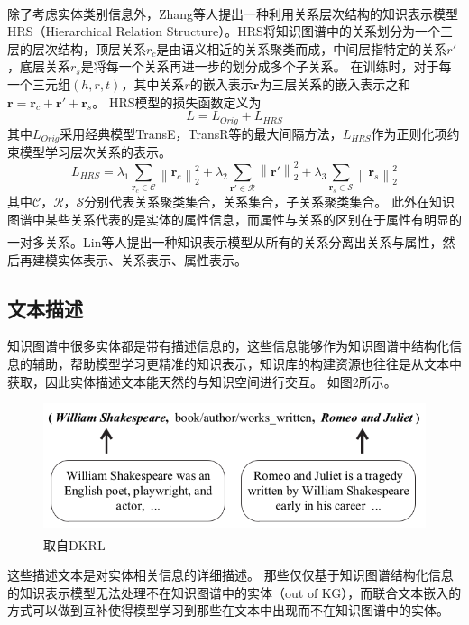 \documentclass[twocolumn]{article}
\newcommand{\upcite}[1]{\textsuperscript{\textsuperscript{\cite{#1}}}}
\begin{document}
	除了考虑实体类别信息外，Zhang等人\upcite{HRS}提出一种利用关系层次结构的知识表示模型HRS（Hierarchical Relation Structure）。HRS将知识图谱中的关系划分为一个三层的层次结构，顶层关系$r_c$是由语义相近的关系聚类而成，中间层指特定的关系$r'$，底层关系$r_s$是将每一个关系再进一步的划分成多个子关系。
	在训练时，对于每一个三元组$(h,r,t)$，其中关系$r$的嵌入表示$\textbf{r}$为三层关系的嵌入表示之和
	$\textbf{r}=\textbf{r}_c+\textbf{r}'+\textbf{r}_s$。
	HRS模型的损失函数定义为
	\begin{equation}
		L=L_{Orig}+L_{HRS}
	\end{equation}
	其中$L_{Orig}$采用经典模型TransE，TransR等的最大间隔方法，$L_{HRS}$作为正则化项约束模型学习层次关系的表示。
	\begin{equation}
		L_{HRS}=\lambda_1\sum_{\textbf{r}_c\in \mathcal{C}}\left \| \textbf{r}_c \right \|_2^2+\lambda_2\sum_{\textbf{r}'\in \mathcal{R}}\left \| \textbf{r}' \right \|_2^2+\lambda_3\sum_{\textbf{r}_s\in\mathcal{S}}\left \| \textbf{r}_s \right \|_2^2
	\end{equation}
	其中$\mathcal{C}$，$\mathcal{R}$，$\mathcal{S}$分别代表关系聚类集合，关系集合，子关系聚类集合。
	此外在知识图谱中某些关系代表的是实体的属性信息，而属性与关系的区别在于属性有明显的一对多关系。Lin等人\upcite{EAR}提出一种知识表示模型从所有的关系分离出关系与属性，然后再建模实体表示、关系表示、属性表示。
	
	
\subsection{文本描述}
	知识图谱中很多实体都是带有描述信息的，这些信息能够作为知识图谱中结构化信息的辅助，帮助模型学习更精准的知识表示，知识库的构建资源也往往是从文本中获取，因此实体描述文本能天然的与知识空间进行交互。
	如图2所示。
	\begin{figure}[ht]
		\centering
		\includegraphics[width=0.8\linewidth]{dkrl.png}
		\caption{取自DKRL\upcite{DKRL}}
\end{figure}
	这些描述文本是对实体相关信息的详细描述。
	那些仅仅基于知识图谱结构化信息的知识表示模型无法处理不在知识图谱中的实体（out of KG），而联合文本嵌入的方式可以做到互补使得模型学习到那些在文本中出现而不在知识图谱中的实体。
	
\end{document}
